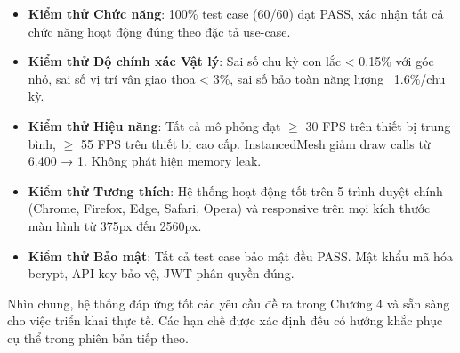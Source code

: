 \begin{itemize}
    \item \textbf{Kiểm thử Chức năng}: 100\% test case (60/60) đạt PASS, xác nhận tất cả chức năng hoạt động đúng theo đặc tả use-case.
    
    \item \textbf{Kiểm thử Độ chính xác Vật lý}: Sai số chu kỳ con lắc < 0.15\% với góc nhỏ, sai số vị trí vân giao thoa < 3\%, sai số bảo toàn năng lượng ~1.6\%/chu kỳ.
    
    \item \textbf{Kiểm thử Hiệu năng}: Tất cả mô phỏng đạt $\geq$ 30 FPS trên thiết bị trung bình, $\geq$ 55 FPS trên thiết bị cao cấp. InstancedMesh giảm draw calls từ 6.400 → 1. Không phát hiện memory leak.
    
    \item \textbf{Kiểm thử Tương thích}: Hệ thống hoạt động tốt trên 5 trình duyệt chính (Chrome, Firefox, Edge, Safari, Opera) và responsive trên mọi kích thước màn hình từ 375px đến 2560px.
    
    \item \textbf{Kiểm thử Bảo mật}: Tất cả test case bảo mật đều PASS. Mật khẩu mã hóa bcrypt, API key bảo vệ, JWT phân quyền đúng.
    
\end{itemize}

Nhìn chung, hệ thống đáp ứng tốt các yêu cầu đề ra trong Chương 4 và sẵn sàng cho việc triển khai thực tế. Các hạn chế được xác định đều có hướng khắc phục cụ thể trong phiên bản tiếp theo.